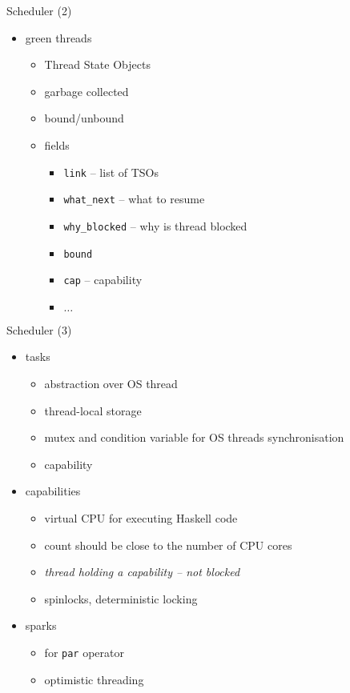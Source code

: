 \documentclass{beamer}
\begin{document}
\begin{frame}{Scheduler (2)}
  \begin{itemize}
    \item green threads
    \begin{itemize}
      \item Thread State Objects
      \item garbage collected
      \item bound/unbound
      \item fields
      \begin{itemize}
        \item \texttt{link} -- list of TSOs
        \item \texttt{what\_next} -- what to resume
        \item \texttt{why\_blocked} -- why is thread blocked
        \item \texttt{bound}
        \item \texttt{cap} -- capability
        \item $\ldots$
      \end{itemize}
    \end{itemize}
  \end{itemize}
\end{frame}

\begin{frame}{Scheduler (3)}
  \begin{itemize}
    \item tasks
    \begin{itemize}
      \item abstraction over OS thread
      \item thread-local storage
      \item mutex and condition variable for OS threads synchronisation
      \item capability
    \end{itemize}
    \pause
    \item capabilities
    \begin{itemize}
      \item virtual CPU for executing Haskell code
      \item count should be close to the number of CPU cores
      \item \textit{thread holding a capability -- not blocked}
      \item spinlocks, deterministic locking
    \end{itemize}
    \pause
    \item sparks
    \begin{itemize}
      \item for \texttt{par} operator
      \item optimistic threading
    \end{itemize}
  \end{itemize}
\end{frame}
\end{document}
